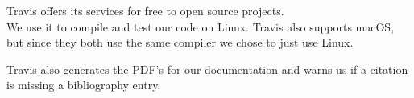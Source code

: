 Travis offers its services for free to open source projects. \cite{travispricing} \\
We use it to compile and test our code on Linux. Travis also supports macOS, but since they both use the same compiler we chose to just use Linux.  

Travis also generates the PDF's for our documentation and warns us if a citation is missing a bibliography entry.  
